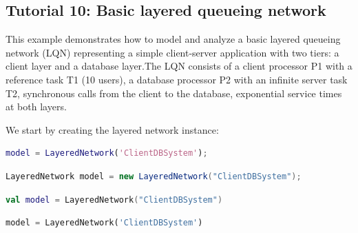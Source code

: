 \subsection{Tutorial 10: Basic layered queueing network}
\label{example-10-basic-layered-queueing-network}

This example demonstrates how to model and analyze a basic layered queueing network (LQN) representing a simple client-server application with two tiers: a client layer and a database layer.The LQN consists of a client processor P1 with a reference task T1 (10 users), a database processor P2 with an infinite server task T2, synchronous calls from the client to the database, exponential service times at both layers.

We start by creating the layered network instance:
\begin{MATLAB}
\begin{lstlisting}[language = matlab]
model = LayeredNetwork('ClientDBSystem');
\end{lstlisting}
\end{MATLAB}
\begin{JAVA}
\begin{lstlisting}[language = java, basicstyle=\ttfamily\scriptsize]
LayeredNetwork model = new LayeredNetwork("ClientDBSystem");
\end{lstlisting}
\end{JAVA}
\begin{KOTLIN}
\begin{lstlisting}[language = kotlin, basicstyle=\ttfamily\scriptsize]
val model = LayeredNetwork("ClientDBSystem")
\end{lstlisting}
\end{KOTLIN}
\begin{PYTHON}
\begin{lstlisting}[language = python]
model = LayeredNetwork('ClientDBSystem')
\end{lstlisting}
\end{PYTHON}

